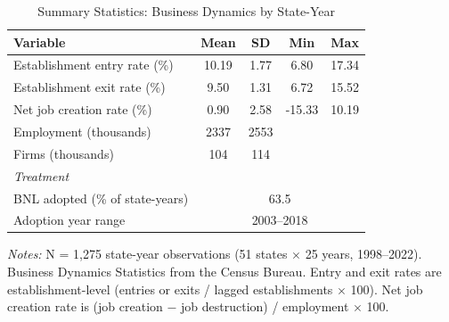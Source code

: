 \begin{table}[H]
\centering
\caption{Summary Statistics: Business Dynamics by State-Year}
\label{tab:summary}
\begin{threeparttable}
\begin{tabular}{lcccc}
\toprule
Variable & Mean & SD & Min & Max \\
\midrule
Establishment entry rate (\%) & 10.19 & 1.77 & 6.80 & 17.34 \\
Establishment exit rate (\%) & 9.50 & 1.31 & 6.72 & 15.52 \\
Net job creation rate (\%) & 0.90 & 2.58 & -15.33 & 10.19 \\
Employment (thousands) & 2337 & 2553 & & \\
Firms (thousands) & 104 & 114 & & \\
\midrule
\multicolumn{5}{l}{\textit{Treatment}} \\
BNL adopted (\% of state-years) & \multicolumn{4}{c}{63.5} \\
Adoption year range & \multicolumn{4}{c}{2003--2018} \\
\bottomrule
\end{tabular}
\begin{tablenotes}[flushleft]
\small
\item \textit{Notes:} N = 1,275 state-year observations (51 states $\times$ 25 years, 1998--2022). Business Dynamics Statistics from the Census Bureau. Entry and exit rates are establishment-level (entries or exits / lagged establishments $\times$ 100). Net job creation rate is (job creation $-$ job destruction) / employment $\times$ 100.
\end{tablenotes}
\end{threeparttable}
\end{table}
